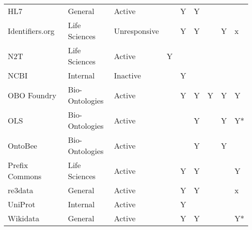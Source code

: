 \begin{table}
\begin{tabular}{lllllllll}
                                    HL7 &         General &       Active &                           &                      Y &                              Y &                        &                      &                        \\
        Identifiers.org~\cite{Juty2012} &   Life Sciences & Unresponsive &                           &                      Y &                              Y &                        &                    Y &                      x \\
             N2T~\cite{Wimalaratne2018} &   Life Sciences &       Active &                         Y &                        &                                &                        &                      &                        \\
                  NCBI~\cite{Clark2016} &        Internal &     Inactive &                           &                      Y &                                &                        &                      &                        \\
         OBO Foundry~\cite{Jackson2021} &  Bio-Ontologies &       Active &                           &                      Y &                              Y &                      Y &                    Y &                      Y \\
                   OLS~\cite{Cote2006a} &  Bio-Ontologies &       Active &                           &                        &                              Y &                        &                    Y &                     Y* \\
                 OntoBee~\cite{Ong2017} &  Bio-Ontologies &       Active &                           &                        &                              Y &                        &                    Y &                        \\
    Prefix Commons~\cite{prefixcommons} &   Life Sciences &       Active &                           &                      Y &                              Y &                        &                      &                      Y \\
                                re3data &         General &       Active &                           &                      Y &                              Y &                        &                      &                      x \\
             UniProt~\cite{Bateman2021} &        Internal &       Active &                           &                      Y &                                &                        &                      &                        \\
        Wikidata~\cite{Waagmeester2020} &         General &       Active &                           &                      Y &                              Y &                        &                      &                     Y* \\
\bottomrule
\end{tabular}
\end{table}
